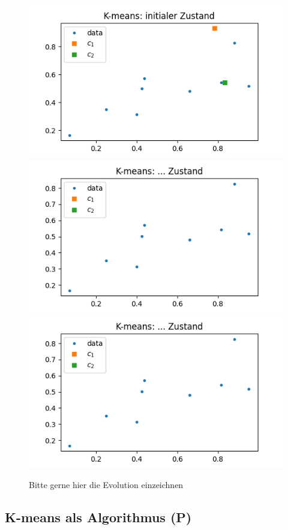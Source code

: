 \documentclass[]{book}
\theoremstyle{definition}
\theoremstyle{definition}
\theoremstyle{definition}
\theoremstyle{definition}
\theoremstyle{remark}
\begin{document}
\begin{figure}

{\centering \includegraphics[width=0.8\linewidth]{bilder/06-manual-kmeans-ini} \includegraphics[width=0.8\linewidth]{bilder/06-manual-kmeans-x} \includegraphics[width=0.8\linewidth]{bilder/06-manual-kmeans-x} 

}

\caption{Bitte gerne hier die Evolution einzeichnen}\label{fig:k-means-evoexaexrcs}
\end{figure}

\hypertarget{k-means-als-algorithmus-p}{%
\subsection{K-means als Algorithmus (P)}\label{k-means-als-algorithmus-p}}
\end{document}
